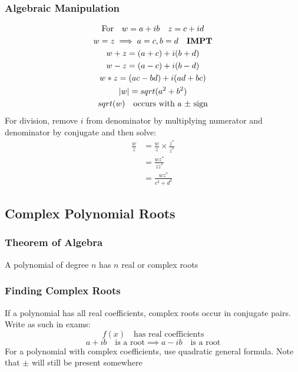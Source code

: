 \documentclass[../main]{subfiles}
\begin{document}
	\subsubsection{Algebraic Manipulation}  
	\begin{equation*} \begin{gathered}
		\text{For} \quad w = a+ib \quad z = c+id \\
		w = z \implies a = c, b = d \quad \text{\bf{IMPT}} \\
		w + z = (a+c) + i(b+d) \\
		w - z = (a-c) + i(b-d) \\
		w * z = (ac-bd) + i(ad+bc) \\
		|w| = sqrt(a^2+b^2) \\
		sqrt(w) \quad \text{occurs with a \(\pm\) sign}
	\end{gathered} \end{equation*}
	For division, remove \(i\) from denominator by multiplying numerator and denominator by conjugate and then solve:
	\begin{equation*} \begin{split}
		\frac{w}{z} & = \frac{w}{z} \times \frac{z^*}{z^*} \\
					& = \frac{wz^*}{zz^*} \\
					& = \frac{wz^*}{c^2+d^2}
	\end{split} \end{equation*}

\subsection{Complex Polynomial Roots}
	
	\subsubsection{Theorem of Algebra}
	A polynomial of degree \(n\) has \(n\) real or complex roots \\
	\subsubsection{Finding Complex Roots}
	If a polynomial has all real coefficients, complex roots occur in conjugate pairs. Write as such in exams:
	\[ f(x) \quad \text{has real coefficients} \]
	\[ a+ib \quad \text{is a root} \implies a-ib \quad \text{is a root} \] 
	For a polynomial with complex coefficients, use quadratic general formula. Note that \(\pm\) will still be present somewhere
\end{document}
